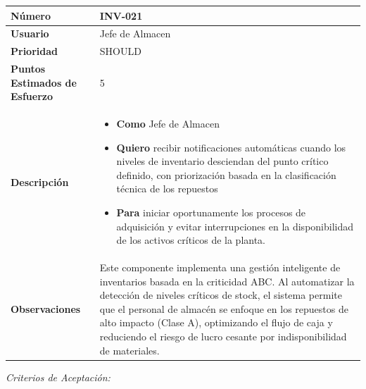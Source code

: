 \begin{longtable}{|p{0.21\textwidth}|p{0.74\textwidth}|}\hline
\textbf{Número} & INV-021 \\ \hline
\textbf{Usuario} & Jefe de Almacen \\ \hline
\textbf{Prioridad} & SHOULD \\ \hline
\textbf{Puntos Estimados de Esfuerzo} & 5 \\ \hline
\textbf{Descripción} & \parbox[t]{\linewidth}{\vspace{2pt}\begin{itemize}[leftmargin=1.5em, nosep, topsep=0pt]
\item \textbf{Como} Jefe de Almacen
\item \textbf{Quiero} recibir notificaciones automáticas cuando los niveles de inventario desciendan del punto crítico definido, con priorización basada en la clasificación técnica de los repuestos
\item \textbf{Para} iniciar oportunamente los procesos de adquisición y evitar interrupciones en la disponibilidad de los activos críticos de la planta.
\end{itemize}\vspace{2pt}} \\ \hline
\textbf{Observaciones} & Este componente implementa una gestión inteligente de inventarios basada en la criticidad ABC. Al automatizar la detección de niveles críticos de stock, el sistema permite que el personal de almacén se enfoque en los repuestos de alto impacto (Clase A), optimizando el flujo de caja y reduciendo el riesgo de lucro cesante por indisponibilidad de materiales. \\ \hline
\end{longtable}\normalsize
\noindent\textit{Criterios de Aceptación:}
